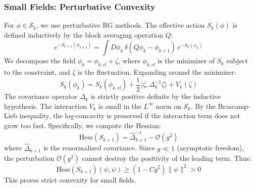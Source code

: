 \subsubsection{Small Fields: Perturbative Convexity}
For $\phi \in \mathcal{S}_k$, we use perturbative RG methods. The effective action $S_k(\phi)$ is defined inductively by the block averaging operation $Q$:
\begin{equation}
    e^{-S_{k+1}(\phi_{k+1})} = \int D\phi_k \, \delta(Q\phi_k - \phi_{k+1}) \, e^{-S_k(\phi_k)}
\end{equation}
We decompose the field $\phi_k = \phi_{k, cl} + \zeta$, where $\phi_{k, cl}$ is the minimizer of $S_k$ subject to the constraint, and $\zeta$ is the fluctuation.
Expanding around the minimizer:
\begin{equation}
    S_k(\phi_k) = S_k(\phi_{k, cl}) + \frac{1}{2} \langle \zeta, \Delta_k^{-1} \zeta \rangle + V_k(\zeta)
\end{equation}
The covariance operator $\Delta_k$ is strictly positive definite by the inductive hypothesis. The interaction $V_k$ is small in the $L^\infty$ norm on $\mathcal{S}_k$.
By the Brascamp-Lieb inequality, the log-concavity is preserved if the interaction term does not grow too fast. Specifically, we compute the Hessian:
\begin{equation}
    \text{Hess}(S_{k+1}) = \hat{\Delta}_{k+1}^{-1} - \mathcal{O}(g^2)
\end{equation}
where $\hat{\Delta}_{k+1}$ is the renormalized covariance. Since $g \ll 1$ (asymptotic freedom), the perturbation $\mathcal{O}(g^2)$ cannot destroy the positivity of the leading term. Thus:
\begin{equation}
    \text{Hess}(S_{k+1})(\psi, \psi) \ge (1 - C g^2) \|\psi\|^2 > 0
\end{equation}
This proves strict convexity for small fields.

